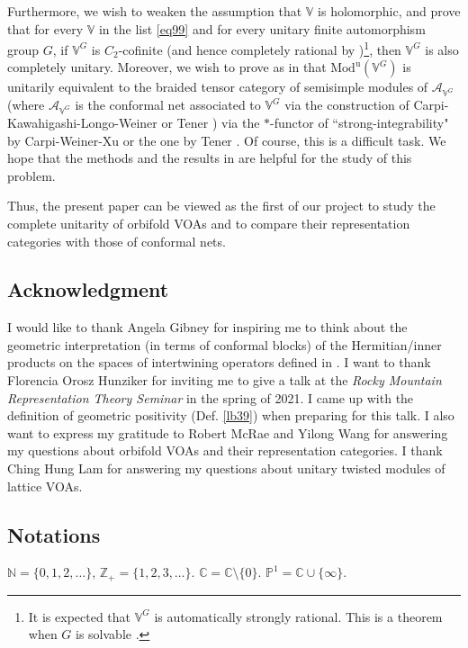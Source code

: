 \documentclass[11pt,b5paper,notitlepage]{article}
\theoremstyle{definition}
\theoremstyle{plain}
\newcommand{\mc}{\mathcal}
\newcommand{\uni}{\mathrm{u}}
\newcommand{\Vbb}{\mathbb V}
\newcommand{\Cbb}{\mathbb C}
\newcommand{\Nbb}{\mathbb N}
\newcommand{\Zbb}{\mathbb Z}
\newcommand{\Pbb}{\mathbb P}
\newcommand{\Mod}{\mathrm{Mod}}
\numberwithin{equation}{section}
\begin{document}
Furthermore, we wish to weaken the assumption that $\Vbb$ is holomorphic, and prove that for every $\Vbb$ in the list \eqref{eq99} and for every unitary finite automorphism group $G$, if $\Vbb^G$ is $C_2$-cofinite (and hence completely rational by \cite{McR21})\footnote{It is expected that $\Vbb^G$ is automatically strongly rational. This is a theorem when $G$ is solvable \cite{Miy15,CM16}.}, then $\Vbb^G$ is also completely unitary. Moreover, we wish to prove as in \cite{Gui20} that $\Mod^\uni(\Vbb^G)$ is unitarily equivalent to the braided tensor category of semisimple modules of $\mc A_{\Vbb^G}$ (where $\mc A_{\Vbb^G}$ is the conformal net associated to $\Vbb^G$ via the construction of Carpi-Kawahigashi-Longo-Weiner \cite{CKLW18} or Tener \cite{Ten19a}) via the $*$-functor of ``strong-integrability" by Carpi-Weiner-Xu \cite{CWX} or the one by Tener \cite{Ten19b}. Of course, this is a difficult task. We hope that the methods and the results in \cite{Gui19c,Ten19c,Gui20,CGGH23,CT23} are helpful for the study of this problem.

Thus, the present paper can be viewed as the first of our project to study the complete unitarity of orbifold VOAs and to compare their representation categories with those of conformal nets.





\subsection*{Acknowledgment}

I would like to thank Angela Gibney for inspiring me to think about the geometric interpretation (in terms of conformal blocks) of the Hermitian/inner products on the spaces of intertwining operators defined in \cite{Gui19b}. I want to thank Florencia Orosz Hunziker for inviting me to give a talk at the \textit{Rocky Mountain Representation Theory Seminar} in the spring of 2021. I came up with the definition of geometric positivity (Def. \ref{lb39}) when preparing for this talk.  I also want to express my gratitude to Robert McRae and Yilong Wang for answering my questions about orbifold VOAs and their representation categories. I thank Ching Hung Lam for answering my questions about unitary twisted modules of lattice VOAs.







\subsection*{Notations}
$\Nbb=\{0,1,2,\dots\}$, $\Zbb_+=\{1,2,3,\dots\}$. $\Cbb=\Cbb\setminus\{0\}$. $\Pbb^1=\Cbb\cup\{\infty\}$.
\end{document}
